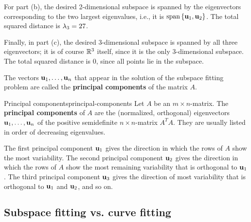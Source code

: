 \begin{solution}
  For part (b), the desired 2-dimensional subspace is spanned by the
  eigenvectors corresponding to the two largest eigenvalues, i.e., it
  is $\sspan\set{\vect{u}_1,\vect{u}_2}$. The total squared distance is
  $\lambda_3 = 27$.

  Finally, in part (c), the desired 3-dimensional subspace is spanned
  by all three eigenvectors; it is of course $\mathbb{R}^3$ itself, since it
  is the only 3-dimensional subspace. The total squared distance is
  $0$, since all points lie in the subspace.
\end{solution}

The vectors $\vect{u}_1,\ldots,\vect{u}_n$ that appear in the solution
of the subspace fitting problem are called the \textbf{principal
  components} of the matrix $A$.

\begin{definition}{Principal components}{principal-components}
  Let $A$ be an $m\times n$-matrix. The \textbf{principal components}%
   of $A$ are the (normalized,
  orthogonal) eigenvectors $\vect{u}_1,\ldots,\vect{u}_n$ of the
  positive semidefinite $n\times n$-matrix $A^TA$. They are usually
  listed in order of decreasing eigenvalues.
\end{definition}

The first principal component $\vect{u}_1$ gives the direction in
which the rows of $A$ show the most variability. The second principal
component $\vect{u}_2$ gives the direction in which the rows of $A$
show the most remaining variability that is orthogonal to
$\vect{u}_1$. The third principal component $\vect{u}_3$ gives the
direction of most variability that is orthogonal to $\vect{u}_1$ and
$\vect{u}_2$, and so on.

\subsection*{Subspace fitting vs. curve fitting}

